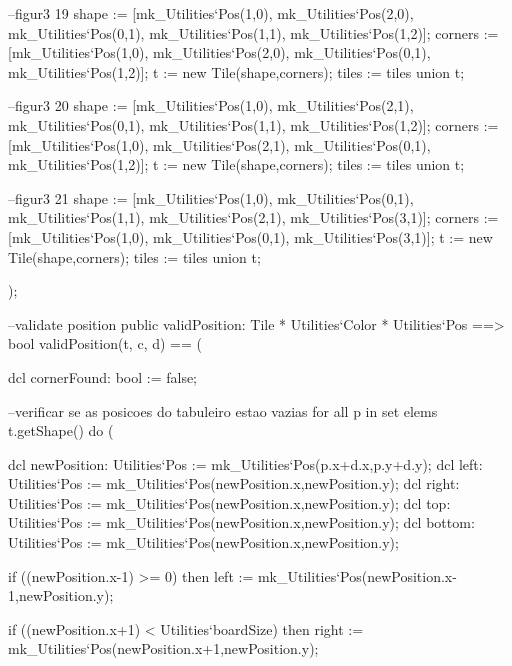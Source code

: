 \begin{vdm_al}
            --figur3 19
            shape := [mk_Utilities`Pos(1,0), mk_Utilities`Pos(2,0), mk_Utilities`Pos(0,1), mk_Utilities`Pos(1,1), mk_Utilities`Pos(1,2)];
            corners := [mk_Utilities`Pos(1,0), mk_Utilities`Pos(2,0), mk_Utilities`Pos(0,1), mk_Utilities`Pos(1,2)];
            t := new Tile(shape,corners); 
            tiles := tiles union {t};
            
            --figur3 20
            shape := [mk_Utilities`Pos(1,0), mk_Utilities`Pos(2,1), mk_Utilities`Pos(0,1), mk_Utilities`Pos(1,1), mk_Utilities`Pos(1,2)];
            corners := [mk_Utilities`Pos(1,0), mk_Utilities`Pos(2,1), mk_Utilities`Pos(0,1), mk_Utilities`Pos(1,2)];
            t := new Tile(shape,corners); 
            tiles := tiles union {t};
            
            --figur3 21
            shape := [mk_Utilities`Pos(1,0), mk_Utilities`Pos(0,1), mk_Utilities`Pos(1,1), mk_Utilities`Pos(2,1), mk_Utilities`Pos(3,1)];
            corners :=  [mk_Utilities`Pos(1,0), mk_Utilities`Pos(0,1), mk_Utilities`Pos(3,1)];
            t := new Tile(shape,corners); 
            tiles := tiles union {t};
            
          );
        
        --validate position
        public validPosition: Tile * Utilities`Color * Utilities`Pos ==> bool
          validPosition(t, c, d) == (
            
            dcl cornerFound: bool := false;
            
            --verificar se as posicoes do tabuleiro estao vazias
            for all p in set elems t.getShape() do (

              dcl newPosition: Utilities`Pos := mk_Utilities`Pos(p.x+d.x,p.y+d.y);
              dcl left: Utilities`Pos := mk_Utilities`Pos(newPosition.x,newPosition.y);
              dcl right: Utilities`Pos := mk_Utilities`Pos(newPosition.x,newPosition.y);              
              dcl top: Utilities`Pos := mk_Utilities`Pos(newPosition.x,newPosition.y);
              dcl bottom: Utilities`Pos := mk_Utilities`Pos(newPosition.x,newPosition.y);
              
              if ((newPosition.x-1) >= 0) then
                left := mk_Utilities`Pos(newPosition.x-1,newPosition.y);
              
              if ((newPosition.x+1) < Utilities`boardSize) then  
                right := mk_Utilities`Pos(newPosition.x+1,newPosition.y);
                

\end{vdm_al}
